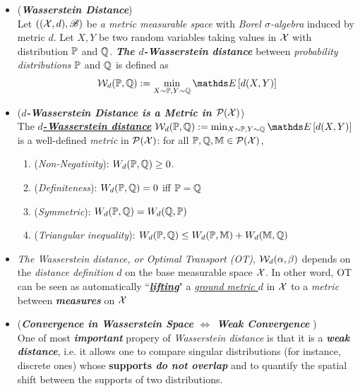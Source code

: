\documentclass[11pt]{article}
\begin{document}
\begin{itemize}
\item \begin{definition} (\textbf{\emph{Wasserstein Distance}}) \\
Let $(({\mathcal X}, d), {\mathscr B})$ be \emph{a metric measurable space} with \emph{Borel $\sigma$-algebra} induced by metric $d$. Let $X, Y$ be two random variables taking values in ${\mathcal X}$ with distribution ${\mathbb P}$ and ${\mathbb Q}$. \emph{\textbf{The $d$-Wasserstein distance}} between \emph{probability distributions} ${\mathbb P}$ and ${\mathbb Q}$ is defined as
\begin{align}
\cW_d(\bP, \bQ) := \min_{X \sim \bP, Y \sim \bQ} \E{}{d(X, Y)} \label{def: wasserstein_dist}
\end{align}
\end{definition}

\item \begin{remark} (\emph{\textbf{$d$-Wasserstein Distance is a Metric in ${\mathcal P}({\mathcal X})$}}) \\
The \underline{\textbf{\emph{$d$-Wasserstein distance}}} $\cW_d(\bP, \bQ) := \min_{X \sim \bP, Y \sim \bQ} \E{}{d(X, Y)}$ is a well-defined \emph{metric} in ${\mathcal P}({\mathcal X})$: for all ${\mathbb P}, {\mathbb Q}, {\mathbb M} \in {\mathcal P}({\mathcal X})$, 
\begin{enumerate}
\item (\emph{Non-Negativity}):\; $W_{d}({\mathbb P}, {\mathbb Q}) \ge 0$.
\item (\emph{Definiteness}):\; $W_{d}({\mathbb P}, {\mathbb Q}) = 0 $ iff ${\mathbb P} = {\mathbb Q}$
\item (\emph{Symmetric}):\; $W_{d}({\mathbb P}, {\mathbb Q}) = W_{d}({\mathbb Q}, {\mathbb P})$
\item (\emph{Triangular inequality}): \; $W_{d}({\mathbb P}, {\mathbb Q})  \le W_{d}({\mathbb P}, {\mathbb M} )  + W_{d}({\mathbb M} , {\mathbb Q}) $
\end{enumerate}
\end{remark}

\item \begin{remark}
\emph{The Wasserstein distance, or Optimal Transport (OT)}, ${\mathcal W}_{d}(\alpha, \beta)$ depends on the \emph{distance definition} $d$ on the base measurable space ${\mathcal X}$. In other word, OT can be seen as automatically ``\underline{\textbf{\emph{lifting}}}" a \underline{\emph{ground metric $d$}} in ${\mathcal X}$ to a \emph{metric} between \textbf{\emph{measures}} on ${\mathcal X}$
\end{remark}

\item \begin{remark} (\textbf{\emph{Convergence in Wasserstein Space $\Leftrightarrow$ Weak Convergence}} ) \citep{villani2009optimal, santambrogio2015optimal, gabriel2019computational} \\
One of most \textbf{\emph{important}} propery of \emph{Wasserstein distance} is that  it is a \emph{\textbf{weak distance}}, i.e. it allows one to compare singular distributions (for instance, discrete ones) whose \textbf{supports \emph{do not overlap}} and to quantify the spatial shift between the supports of two distributions. 


\end{remark}
\end{itemize}
\end{document}
